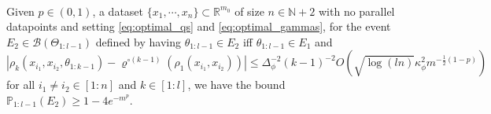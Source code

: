 \documentclass[twoside,11pt]{article}
\newcommand{\R}{\mathbb{R}}
\newcommand{\N}{\mathbb{N}}
\newcommand{\Prob}{\mathbb{P}}
\begin{document}
\begin{proposition}\label{prop:limiting_cosine_concentration}~\\
Given $p \in (0,1)$, a dataset $\{ x_1,\cdots,x_n \} \subset \R^{m_0}$ of size $n \in \N+2$ with no parallel datapoints and setting \eqref{eq:optimal_qs} and \eqref{eq:optimal_gammas}, for the event $E_2 \in \mathcal{B}(\Theta_{1:l-1})$ defined by having $\theta_{1:l-1} \in E_2$ iff $\theta_{1:l-1} \in E_1$ and
\[
\left\vert \rho_k(x_{i_1},x_{i_2},\theta_{1:k-1}) - \varrho^{\circ(k-1)}(\rho_1(x_{i_1},x_{i_2})) \right\vert
\leq \Delta_\phi^{-2} (k-1)^{-2} O\left( \sqrt{\log(ln)} \kappa_\phi^2 m^{-\frac{1}{2}(1-p)} \right)
\]
for all $i_1 \neq i_2 \in [1:n]$ and $k \in [1:l]$, we have the bound $\Prob_{1:l-1}(E_2) \geq 1-4e^{-m^p}$.
\end{proposition}
\end{document}
